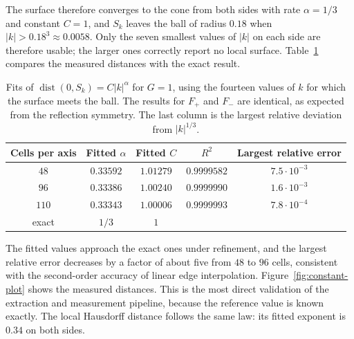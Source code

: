 \documentclass[12pt, a4paper, oneside]{book}
\theoremstyle{plain}
\theoremstyle{definition}
\theoremstyle{remark}
\begin{document}
The surface therefore converges to the cone from both sides with rate
$\alpha=1/3$ and constant $C=1$, and $S_k$ leaves the ball of radius $0.18$
when $|k|>0.18^3\approx0.0058$. Only the seven smallest values of $|k|$ on each
side are therefore usable; the larger ones correctly report no local surface.
Table~\ref{tab:constant-fit} compares the measured distances with the exact
result.

\begin{table}[!h]
\centering
\small
\begin{tabular}{c c c c c}
\toprule
Cells per axis & Fitted $\alpha$ & Fitted $C$ & $R^2$ & Largest relative error \\
\midrule
$48$  & $0.33592$ & $1.01279$ & $0.9999582$ & $7.5\cdot10^{-3}$ \\
$96$  & $0.33386$ & $1.00240$ & $0.9999990$ & $1.6\cdot10^{-3}$ \\
$110$ & $0.33343$ & $1.00006$ & $0.9999993$ & $7.8\cdot10^{-4}$ \\
\midrule
exact & $1/3$ & $1$ & & \\
\bottomrule
\end{tabular}
\caption[Constant perturbation: distance fits]{Fits of
$\operatorname{dist}(0,S_k)=C|k|^\alpha$ for $G=1$, using the fourteen values
of $k$ for which the surface meets the ball. The results for $F_+$ and $F_-$
are identical, as expected from the reflection symmetry. The last column is
the largest relative deviation from $|k|^{1/3}$.}
\label{tab:constant-fit}
\end{table}

The fitted values approach the exact ones under refinement, and the largest
relative error decreases by a factor of about five from $48$ to $96$ cells,
consistent with the second-order accuracy of linear edge interpolation.
Figure~\ref{fig:constant-plot} shows the measured distances. This is the most
direct validation of the extraction and measurement pipeline, because the
reference value is known exactly. The local Hausdorff distance follows the same
law: its fitted exponent is $0.34$ on both sides.
\end{document}
